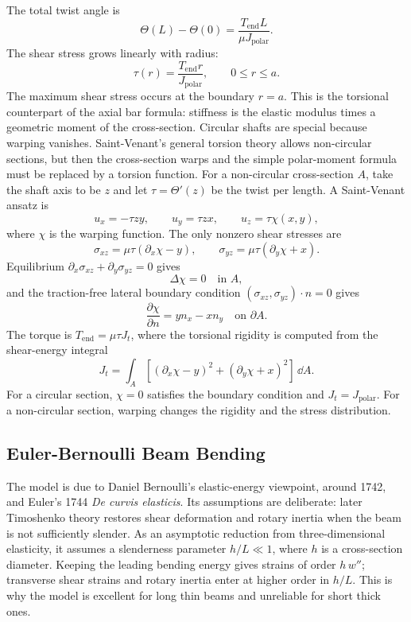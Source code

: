 The total twist angle is
\[
  \boxed{
  \Theta(L)-\Theta(0)=
  \frac{T_{\mathrm{end}}L}{\mu J_{\mathrm{polar}}}.
  }
\]
The shear stress grows linearly with radius:
\[
  \tau(r)=\frac{T_{\mathrm{end}}r}{J_{\mathrm{polar}}},
  \qquad
  0\leq r\leq a.
\]
The maximum shear stress occurs at the boundary \(r=a\). This is the torsional
counterpart of the axial bar formula: stiffness is the elastic modulus times a
geometric moment of the cross-section.
Circular shafts are special because warping vanishes. Saint-Venant's general
torsion theory allows non-circular sections, but then the cross-section warps and
the simple polar-moment formula must be replaced by a torsion function.
For a non-circular cross-section \(A\), take the shaft axis to be \(z\) and let
\(\tau=\Theta'(z)\) be the twist per length. A Saint-Venant ansatz is
\[
  u_x=-\tau zy,\qquad
  u_y=\tau zx,\qquad
  u_z=\tau\chi(x,y),
\]
where \(\chi\) is the warping function. The only nonzero shear stresses are
\[
  \sigma_{xz}=\mu\tau(\partial_x\chi-y),
  \qquad
  \sigma_{yz}=\mu\tau(\partial_y\chi+x).
\]
Equilibrium \(\partial_x\sigma_{xz}+\partial_y\sigma_{yz}=0\) gives
\[
  \Delta\chi=0\quad\text{in }A,
\]
and the traction-free lateral boundary condition
\((\sigma_{xz},\sigma_{yz})\cdot n=0\) gives
\[
  \frac{\partial\chi}{\partial n}=yn_x-xn_y
  \quad\text{on }\partial A.
\]
The torque is \(T_{\mathrm{end}}=\mu\tau J_t\), where the torsional rigidity is
computed from the shear-energy integral
\[
  J_t=
  \int_A
  \left[(\partial_x\chi-y)^2+(\partial_y\chi+x)^2\right]\,\dd A .
\]
For a circular section, \(\chi=0\) satisfies the boundary condition and
\(J_t=J_{\mathrm{polar}}\). For a non-circular section, warping changes the
rigidity and the stress distribution.

\subsection{Euler-Bernoulli Beam Bending}
\label{subsec:euler-bernoulli-beam}

The model is due to Daniel Bernoulli's elastic-energy viewpoint, around 1742,
and Euler's 1744 \emph{De curvis elasticis}. Its assumptions are deliberate: later
Timoshenko theory restores shear deformation and rotary inertia when the beam
is not sufficiently slender.
As an asymptotic reduction from three-dimensional elasticity, it assumes a
slenderness parameter \(h/L\ll1\), where \(h\) is a cross-section diameter.
Keeping the leading bending energy gives strains of order \(h\,w''\); transverse
shear strains and rotary inertia enter at higher order in \(h/L\). This is why
the model is excellent for long thin beams and unreliable for short thick ones.

